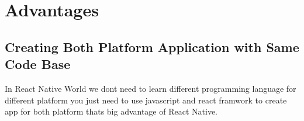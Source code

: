 \documentclass[12pt,a4paper]{report}
\begin{document}
\newpage

\section{Advantages}

\subsection{Creating Both Platform Application with Same Code Base}
In React Native World we dont need to learn different programming language for different platform you just need to use javascript and react framwork to create app for both platform thats big advantage of React Native.
\end{document}
